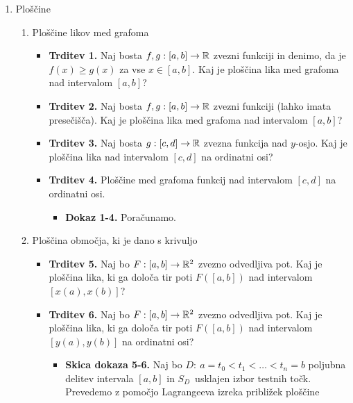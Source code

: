\begin{enumerate}
    \newpage
    \item Ploščine
    \begin{enumerate}
        \item Ploščine likov med grafoma
        \begin{itemize}
            \item \colorbox{blue!30}{\textbf{Trditev 1.}} Naj bosta $f, g: [a,b] \to \mathbb{R}$ zvezni funkciji in denimo, da je $f(x) \geq g(x)$ za vse $x \in [a,b]$. Kaj je ploščina lika med grafoma nad intervalom $[a,b]$? 
            \item \colorbox{blue!30}{\textbf{Trditev 2.}} Naj bosta $f, g: [a,b] \to \mathbb{R}$ zvezni funkciji (lahko imata presečišča). Kaj je ploščina lika med grafoma nad intervalom $[a,b]$? 
            \item \colorbox{blue!30}{\textbf{Trditev 3.}} Naj bosta $g: [c,d] \to \mathbb{R}$ zvezna funkcija nad $y$-osjo. Kaj je ploščina lika nad intervalom $[c,d]$ na ordinatni osi?
            \item \colorbox{blue!30}{\textbf{Trditev 4.}} Ploščine med grafoma funkcij nad intervalom $[c,d]$ na ordinatni osi.
            \begin{itemize}
                \item \colorbox{green!30}{\textbf{Dokaz 1-4.}} Poračunamo. 
            \end{itemize}
        \end{itemize}
        \item Ploščina območja, ki je dano s krivuljo
        \begin{itemize}
            \item \colorbox{blue!30}{\textbf{Trditev 5.}} Naj bo $F: [a,b] \to \mathbb{R}^2$ zvezno odvedljiva pot. Kaj je ploščina lika, ki ga določa tir poti $F([a,b])$ nad intervalom $[x(a), x(b)]$?
            \item \colorbox{blue!30}{\textbf{Trditev 6.}} Naj bo $F: [a,b] \to \mathbb{R}^2$ zvezno odvedljiva pot. Kaj je ploščina lika, ki ga določa tir poti $F([a,b])$ nad intervalom $[y(a), y(b)]$ na ordinatni osi?
            \begin{itemize}
                \item \colorbox{green!30}{\textbf{Skica dokaza 5-6.}} Naj bo $D: \ a =t_0 < t_1 < \ldots < t_n = b$ poljubna delitev intervala $[a,b]$ in $S_D$~usklajen izbor testnih točk. Prevedemo z pomočjo Lagrangeeva izreka približek ploščine
                

\end{itemize}
\end{itemize}
\end{enumerate}
\end{enumerate}
